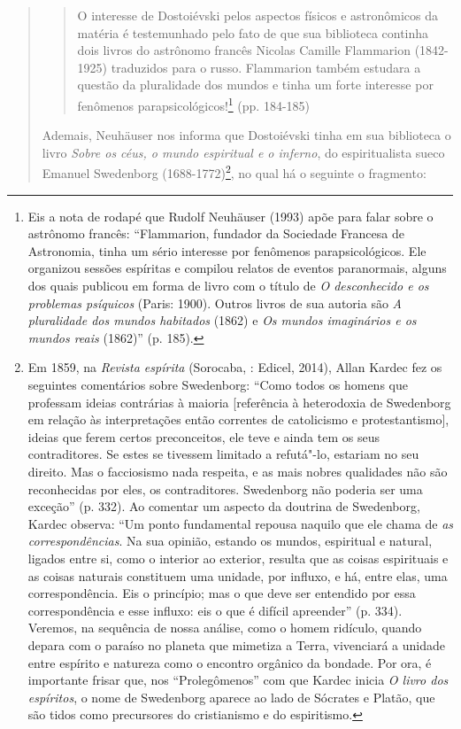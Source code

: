 {\begin{quote}
\begin{quote}
O interesse de Dostoiévski pelos aspectos físicos e astronômicos da
matéria é testemunhado pelo fato de que sua biblioteca continha dois
livros do astrônomo francês Nicolas Camille Flammarion (1842-1925)
traduzidos para o russo. Flammarion também estudara a questão da
pluralidade dos mundos e tinha um forte interesse por fenômenos
parapsicológicos!\footnote{Eis a nota de rodapé que Rudolf Neuhäuser
  (1993) apõe para falar sobre o astrônomo francês: ``Flammarion,
  fundador da Sociedade Francesa de Astronomia, tinha um sério interesse
  por fenômenos parapsicológicos. Ele organizou sessões espíritas e
  compilou relatos de eventos paranormais, alguns dos quais publicou em
  forma de livro com o título de \emph{O desconhecido e os problemas
  psíquicos} (Paris: 1900). Outros livros de sua autoria são \emph{A
  pluralidade dos mundos habitados} (1862) e \emph{Os mundos imaginários
  e os mundos reais} (1862)'' (p. 185).} (pp. 184-185)
\end{quote}

Ademais, Neuhäuser nos informa que Dostoiévski tinha em sua biblioteca o
livro \emph{Sobre os céus, o mundo espiritual e o inferno}, do
espiritualista sueco Emanuel Swedenborg (1688-1772)\footnote{Em 1859, na
  \emph{Revista espírita} (Sorocaba, : Edicel, 2014), Allan Kardec fez
  os seguintes comentários sobre Swedenborg: ``Como todos os homens que
  professam ideias contrárias à maioria {[}referência à heterodoxia de
  Swedenborg em relação às interpretações então correntes de catolicismo
  e protestantismo{]}, ideias que ferem certos preconceitos, ele teve e
  ainda tem os seus contraditores. Se estes se tivessem limitado a
  refutá"-lo, estariam no seu direito. Mas o facciosismo nada respeita, e
  as mais nobres qualidades não são reconhecidas por eles, os
  contraditores. Swedenborg não poderia ser uma exceção'' (p. 332). Ao
  comentar um aspecto da doutrina de Swedenborg, Kardec observa: ``Um
  ponto fundamental repousa naquilo que ele chama de \emph{as
  correspondências}. Na sua opinião, estando os mundos, espiritual e
  natural, ligados entre si, como o interior ao exterior, resulta que as
  coisas espirituais e as coisas naturais constituem uma unidade, por
  influxo, e há, entre elas, uma correspondência. Eis o princípio; mas o
  que deve ser entendido por essa correspondência e esse influxo: eis o
  que é difícil apreender'' (p. 334). Veremos, na sequência de nossa
  análise, como o homem ridículo, quando depara com o paraíso no planeta
  que mimetiza a Terra, vivenciará a unidade entre espírito e natureza
  como o encontro orgânico da bondade. Por ora, é importante frisar que,
  nos ``Prolegômenos'' com que Kardec inicia \emph{O livro dos
  espíritos}, o nome de Swedenborg aparece ao lado de Sócrates e Platão,
  que são tidos como precursores do cristianismo e do espiritismo.}, no
qual há o seguinte o fragmento:


\end{quote}}
